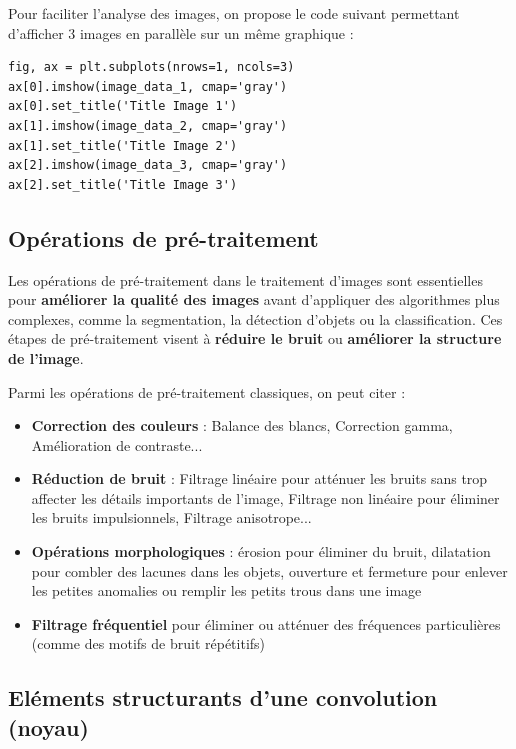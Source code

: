 \documentclass[a4paper,11pt,titlepage]{article} %
\begin{document}
\medskip

Pour faciliter l'analyse des images, on propose le code suivant permettant d'afficher 3 images en parallèle sur un même graphique :

\begin{lstlisting}
fig, ax = plt.subplots(nrows=1, ncols=3)    
ax[0].imshow(image_data_1, cmap='gray')
ax[0].set_title('Title Image 1')  
ax[1].imshow(image_data_2, cmap='gray')
ax[1].set_title('Title Image 2')
ax[2].imshow(image_data_3, cmap='gray')
ax[2].set_title('Title Image 3')
\end{lstlisting}


\subsection{Opérations de pré-traitement}

Les opérations de pré-traitement dans le traitement d'images sont essentielles pour \textbf{améliorer la qualité des images} avant d'appliquer des algorithmes plus complexes, comme la segmentation, la détection d'objets ou la classification. Ces étapes de pré-traitement visent à \textbf{réduire le bruit} ou \textbf{améliorer la structure de l'image}. 

Parmi les opérations de pré-traitement classiques, on peut citer :

\begin{itemize}
	\item \textbf{Correction des couleurs} : Balance des blancs, Correction gamma, Amélioration de contraste...
	\item \textbf{Réduction de bruit} : Filtrage linéaire pour atténuer les bruits sans trop affecter les détails importants de l'image, Filtrage non linéaire pour éliminer les bruits impulsionnels, Filtrage anisotrope...
	\item \textbf{Opérations morphologiques} : érosion pour éliminer du bruit, dilatation pour combler des lacunes dans les objets, ouverture et fermeture pour enlever les petites anomalies ou remplir les petits trous dans une image
	\item \textbf{Filtrage fréquentiel} pour éliminer ou atténuer des fréquences particulières (comme des motifs de bruit répétitifs) 
\end{itemize}

\subsection{Eléments structurants d'une convolution (noyau)}
\end{document}

